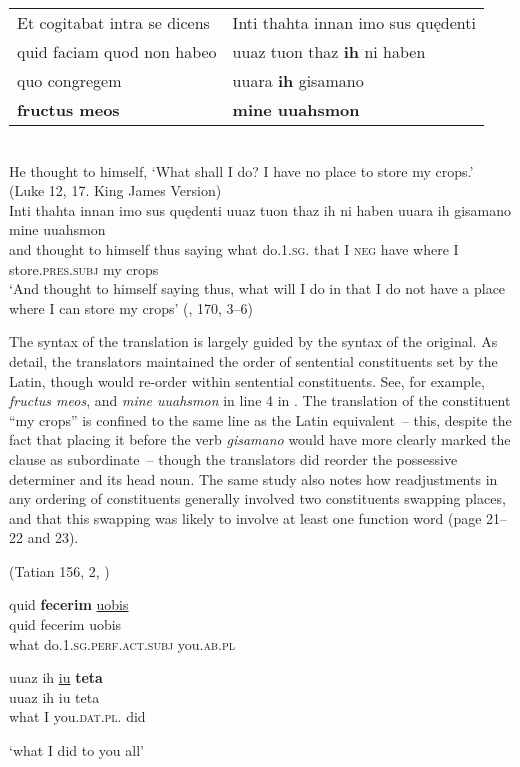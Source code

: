 \ea%
\label{ex:3:1}
\parbox[t]{\linewidth}{%
      \vspace{-.7\baselineskip}%
      \begin{tabular}{@{}ll@{}}
      Et cogitabat intra se dicens  &  Inti thahta innan imo sus quędenti\\
      quid faciam quod non habeo    & uuaz tuon thaz \textbf{ih} ni haben\\
      quo congregem                 & uuara \textbf{ih} gisamano         \\
      \textbf{fructus meos}         &  \textbf{mine uuahsmon}            \\
      \end{tabular}
}\medskip\\
He thought to himself, ‘What shall I do? I have no place to store my crops.’ (Luke 12, 17. King James Version)\\
\gll  Inti  thahta   innan  imo   sus     quędenti uuaz  tuon     thaz    ih   ni   haben uuara   ih   gisamano  mine  uuahsmon\\
and  thought  to     himself  thus   saying what  do.\textsc{1.sg.}    that    I  \textsc{neg}   have where  I   store.\textsc{pres.subj} my     crops\\
\glt ‘And thought to himself saying thus, what will I do in that I do not have a place where I can store my crops’ (\citealt{Masser1994}, 170, 3--6)
\z

\noindent The syntax of the translation is largely guided by the syntax of the original. As \citet[21]{DittmerDittmer1998} detail, the translators maintained the order of sentential constituents set by the Latin, though would re-order within sentential constituents. See, for example, \textit{fructus meos}, and \textit{mine uuahsmon} in line 4 in . The translation of the constituent “my crops” is confined to the same line as the Latin equivalent~-- this, despite the fact that placing it before the verb \textit{gisamano} would have more clearly marked the clause as subordinate~-- though the translators did reorder the possessive determiner and its head noun. The same study also notes how readjustments in any ordering of constituents generally involved two constituents swapping places, and that this swapping was likely to involve at least one function word (page 21--22 and 23).

\ea%
    \label{ex:3:2}(Tatian 156, 2, \citealt{Sievers1961})\medskip\\
   \parbox{.55\linewidth}{
      quid \textbf{fecerim} \ul{uobis}\\
      \gll quid  fecerim           uobis\\
           what   do.1.\textsc{sg.perf.act.subj}    you.\textsc{ab.pl}\\}
\hfill\parbox{.4\linewidth}
  {uuaz ih \ul{iu} \textbf{teta}\\
\gll uuaz   ih   iu         teta\\
what  I  you.\textsc{dat.pl.}   did\\}
\glt ‘what I did to you all’
\z

